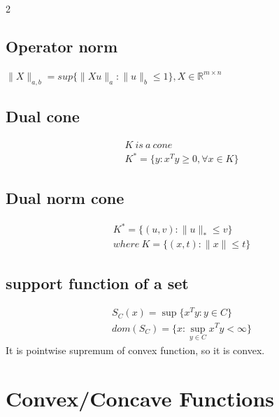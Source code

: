 \documentclass[8pt]{extarticle}
\newcommand{\R}{\mathbb{R}}
\newcommand{\norm}[1]{\|#1\|}
\newcommand{\set}[1]{\{#1\}}
\begin{document}
\begin{multicols*}{2}
  \subsection{Operator norm}
  $\norm{X}_{a,b}=sup\{\norm{Xu}_a : \norm{u}_b \leq 1 \}, X \in \R^{m\times n}$
  
  \subsection{Dual cone}
  \begin{align*}
    K\ is\ a\ cone\\
    K^* = \{y:x^T y \geq 0, \forall x \in K\}
  \end{align*}

  \subsection{Dual norm cone}

  \begin{align*}
    K^* = \set{(u,v): \norm{u}_* \leq v}\\
    where\ K = \set{(x,t): \norm{x} \leq t}
  \end{align*}
  
    
  
  \subsection{support function of a set}
  \begin{align*}
    S_C(x) = \sup \set{x^T y : y \in C}\\
    dom(S_C) = \set{x: \sup_{y\in C} x^Ty < \infty}
  \end{align*}
  It is pointwise supremum of convex function, so it is convex.

  \vfill\null
  \columnbreak
    
  \section{Convex/Concave Functions}


\end{multicols*}
\end{document}
